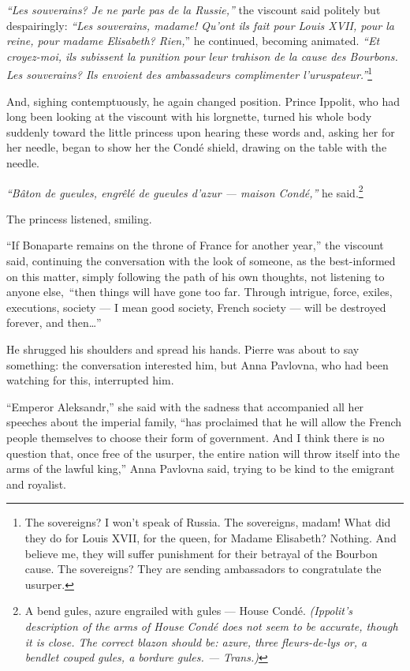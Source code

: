 \textit{``Les souverains? Je ne parle pas de la Russie,''} the
viscount said politely but despairingly: \textit{``Les souverains,
  madame! Qu'ont ils fait pour Louis XVII, pour la reine, pour madame
  Elisabeth? Rien,}'' he continued, becoming animated. \textit{``Et
  croyez-moi, ils subissent la punition pour leur trahison de la cause
  des Bourbons. Les souverains? Ils envoient des ambassadeurs
  complimenter l'uruspateur.''}\footnote{The sovereigns? I won't speak
  of Russia. The sovereigns, madam! What did they do for Louis XVII,
  for the queen, for Madame Elisabeth? Nothing. And believe me, they
  will suffer punishment for their betrayal of the Bourbon cause. The
  sovereigns? They are sending ambassadors to congratulate the
  usurper.}

And, sighing contemptuously, he again changed position. Prince
Ippolit, who had long been looking at the viscount with his
lorgnette, turned his whole body suddenly toward the little princess
upon hearing these words and, asking her for her needle, began to show
her the Cond\'e shield, drawing on the table with the needle.

\textit{``B\^aton de gueules, engr\^el\'e de gueules d'azur --- maison
  Cond\'e,''} he said.\footnote{A bend gules, azure engrailed with
  gules --- House Cond\'e. \textit{(Ippolit's description of the arms
    of House Cond\'e does not seem to be accurate, though it is
    close. The correct blazon should be: azure, three fleurs-de-lys
    or, a bendlet couped gules, a bordure gules. --- Trans.)}}

The princess listened, smiling.

``If Bonaparte remains on the throne of France for another year,'' the
viscount said, continuing the conversation with the look of someone,
as the best-informed on this matter, simply following the path of his
own thoughts, not listening to anyone else,\ ``then things
will have gone too far. Through intrigue, force, exiles, executions,
society --- I mean good society, French society --- will be destroyed
forever, and then\ldots{}''

He shrugged his shoulders and spread his hands. Pierre was about to
say something: the conversation interested him, but Anna Pavlovna, who
had been watching for this, interrupted him.

``Emperor Aleksandr,'' she said with the sadness that accompanied all
her speeches about the imperial family, ``has proclaimed that he will
allow the French people themselves to choose their form of
government. And I think there is no question that, once free of the
usurper, the entire nation will throw itself into the arms of the
lawful king,'' Anna Pavlovna said, trying to be kind to the emigrant
and royalist.

